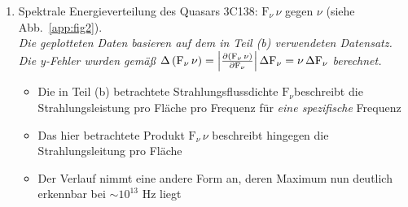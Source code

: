 \documentclass[11pt,a4paper]{scrartcl}
\newcommand*{\figref}[1]{(siehe Abb.~\ref{#1})}
\newcommand{\Fnu}{\ensuremath{\mathrm{F}_{\nu}}}
\begin{document}
\begin{enumerate}[label=\textbf{\large(\alph*)}]
\vspace*{\baselineskip}

\item
Spektrale Energieverteilung des Quasars 3C138: $\Fnu\,\nu$
gegen $\nu$ \figref{app:fig2}. \\
\textit{\small Die geplotteten Daten basieren auf dem in Teil (b)
    verwendeten Datensatz. Die y-Fehler wurden gemäß
    $\Delta\left(\Fnu\,\nu\right) = \abs{\pdv{(\Fnu\,\nu)}{\Fnu}}\,\Delta\Fnu =
    \nu\,\Delta\Fnu$ berechnet.}

    \begin{itemize}
        \item Die in Teil (b) betrachtete Strahlungsflussdichte
            \Fnu beschreibt die Strahlungsleistung pro Fläche
            pro Frequenz für \emph{eine spezifische} Frequenz
        \item Das hier betrachtete Produkt $\Fnu\,\nu$
            beschreibt hingegen die Strahlungsleitung pro Fläche


        \item Der Verlauf nimmt eine andere Form an, deren Maximum nun
            deutlich erkennbar bei $\sim 10^{13}$ \si{\hertz} liegt
    \end{itemize}

\end{enumerate}

\newpage


\end{document}
